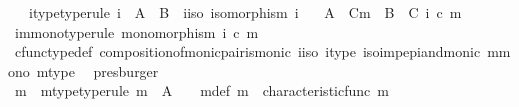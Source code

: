 \begin{isabellebody}
\ \ \ i{\isacharunderscore}{\kern0pt}type{\isacharbrackleft}{\kern0pt}type{\isacharunderscore}{\kern0pt}rule{\isacharbrackright}{\kern0pt}{\isacharcolon}{\kern0pt}\ {\isachardoublequoteopen}i\ {\isacharcolon}{\kern0pt}\ A\ {\isasymrightarrow}\ B{\isachardoublequoteclose}\ \ i{\isacharunderscore}{\kern0pt}iso{\isacharcolon}{\kern0pt}\ {\isachardoublequoteopen}isomorphism\ i{\isachardoublequoteclose}\isanewline
\ \ \ {\isachardoublequoteopen}A\ {\isasymsetminus}\ {\isacharparenleft}{\kern0pt}C{\isacharcomma}{\kern0pt}m{\isacharparenright}{\kern0pt}\ {\isasymcong}\ B\ {\isasymsetminus}\ {\isacharparenleft}{\kern0pt}C{\isacharcomma}{\kern0pt}\ i\ {\isasymcirc}\isactrlsub c\ m{\isacharparenright}{\kern0pt}{\isachardoublequoteclose}\isanewline
%
\isadelimproof
%
\endisadelimproof
%
\isatagproof
{}\isamarkupfalse%
\ {\isacharminus}{\kern0pt}\isanewline
\ \ \isamarkupfalse%
\ im{\isacharunderscore}{\kern0pt}mono{\isacharbrackleft}{\kern0pt}type{\isacharunderscore}{\kern0pt}rule{\isacharbrackright}{\kern0pt}{\isacharcolon}{\kern0pt}\ {\isachardoublequoteopen}monomorphism\ {\isacharparenleft}{\kern0pt}i\ {\isasymcirc}\isactrlsub c\ m{\isacharparenright}{\kern0pt}{\isachardoublequoteclose}\isanewline
\ \ \ \ \isamarkupfalse%
\ cfunc{\isacharunderscore}{\kern0pt}type{\isacharunderscore}{\kern0pt}def\ composition{\isacharunderscore}{\kern0pt}of{\isacharunderscore}{\kern0pt}monic{\isacharunderscore}{\kern0pt}pair{\isacharunderscore}{\kern0pt}is{\isacharunderscore}{\kern0pt}monic\ i{\isacharunderscore}{\kern0pt}iso\ i{\isacharunderscore}{\kern0pt}type\ iso{\isacharunderscore}{\kern0pt}imp{\isacharunderscore}{\kern0pt}epi{\isacharunderscore}{\kern0pt}and{\isacharunderscore}{\kern0pt}monic\ m{\isacharunderscore}{\kern0pt}mono\ m{\isacharunderscore}{\kern0pt}type\ \isamarkupfalse%
\ presburger\isanewline
\ \ \isamarkupfalse%
\ {\isasymchi}m\ \ {\isasymchi}m{\isacharunderscore}{\kern0pt}type{\isacharbrackleft}{\kern0pt}type{\isacharunderscore}{\kern0pt}rule{\isacharbrackright}{\kern0pt}{\isacharcolon}{\kern0pt}\ {\isachardoublequoteopen}{\isasymchi}m\ {\isacharcolon}{\kern0pt}\ A\ {\isasymrightarrow}\ {\isasymOmega}{\isachardoublequoteclose}\ \ {\isasymchi}m{\isacharunderscore}{\kern0pt}def{\isacharcolon}{\kern0pt}\ {\isachardoublequoteopen}{\isasymchi}m\ {\isacharequal}{\kern0pt}\ characteristic{\isacharunderscore}{\kern0pt}func\ m{\isachardoublequoteclose}\isanewline
\ \ \ \ \isamarkupfalse%

\end{isabellebody}
